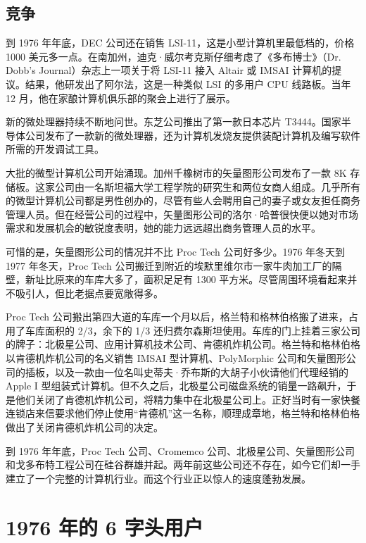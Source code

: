 \documentclass[12pt,UTF8]{ctexbook}
\begin{document}
\subsection{竞争}


到 1976 年年底，DEC 公司还在销售 LSI-11，这是小型计算机里最低档的，价格 1000 美元多一点。在南加州，迪克·威尔考克斯仔细考虑了《多布博士》（Dr. Dobb's Journal）杂志上一项关于将 LSI-11 接入 Altair 或 IMSAI 计算机的提议。结果，他研发出了阿尔法，这是一种类似 LSI 的多用户 CPU 线路板。当年 12 月，他在家酿计算机俱乐部的聚会上进行了展示。

新的微处理器持续不断地问世。东芝公司推出了第一款日本芯片 T3444。国家半导体公司发布了一款新的微处理器，还为计算机发烧友提供装配计算机及编写软件所需的开发调试工具。

大批的微型计算机公司开始涌现。加州千橡树市的矢量图形公司发布了一款 8K 存储板。这家公司由一名斯坦福大学工程学院的研究生和两位女商人组成。几乎所有的微型计算机公司都是男性创办的，尽管有些人会聘用自己的妻子或女友担任商务管理人员。但在经营公司的过程中，矢量图形公司的洛尔·哈普很快便以她对市场需求和发展机会的敏锐度表明，她的能力远远超出商务管理人员的水平。

可惜的是，矢量图形公司的情况并不比 Proc Tech 公司好多少。1976 年冬天到 1977 年冬天，Proc Tech 公司搬迁到附近的埃默里维尔市一家牛肉加工厂的隔壁，新址比原来的车库大多了，面积足足有 1300 平方米。尽管周围环境看起来并不吸引人，但比老据点要宽敞得多。

Proc Tech 公司搬出第四大道的车库一个月以后，格兰特和格林伯格搬了进来，占用了车库面积的 2/3，余下的 1/3 还归费尔森斯坦使用。车库的门上挂着三家公司的牌子：北极星公司、应用计算机技术公司、肯德机炸机公司。格兰特和格林伯格以肯德机炸机公司的名义销售 IMSAI 型计算机、PolyMorphic 公司和矢量图形公司的插板，以及一款由一位名叫史蒂夫·乔布斯的大胡子小伙请他们代理经销的 Apple I 型组装式计算机。但不久之后，北极星公司磁盘系统的销量一路飙升，于是他们关闭了肯德机炸机公司，将精力集中在北极星公司上。正好当时有一家快餐连锁店来信要求他们停止使用“肯德机”这一名称，顺理成章地，格兰特和格林伯格做出了关闭肯德机炸机公司的决定。

到 1976 年年底，Proc Tech 公司、Cromemco 公司、北极星公司、矢量图形公司和戈多布特工程公司在硅谷群雄并起。两年前这些公司还不存在，如今它们却一手建立了一个完整的计算机行业。而这个行业正以惊人的速度蓬勃发展。





\section{1976 年的 6 字头用户}
\end{document}
